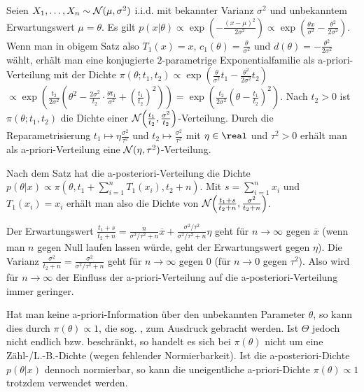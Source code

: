 \linie
\pagebreak

\begin{Bsp}
    Seien $X_1, \dotsc, X_n \sim \mathcal{N}(\mu, \sigma^2)$ i.i.d. mit bekannter Varianz $\sigma^2$
    und unbekanntem Erwartungswert $\mu = \theta$.
    Es gilt $p(x|\theta) \propto \exp\!\left(-\frac{(x - \mu)^2}{2\sigma^2}\right) \propto
    \exp\!\left(\frac{\theta x}{\sigma^2} - \frac{\theta^2}{2\sigma^2}\right)$.
    Wenn man in obigem Satz also $T_1(x) = x$, $c_1(\theta) = \frac{\theta}{\sigma^2}$ und
    $d(\theta) = -\frac{\theta^2}{2\sigma^2}$ wählt,
    erhält man eine konjugierte $2$-parametrige Exponentialfamilie als a-priori-Verteilung mit der
    Dichte $\pi(\theta; t_1, t_2) \propto
    \exp\!\left(\frac{\theta}{\sigma^2} t_1 - \frac{\theta^2}{2\sigma^2} t_2\right)$\\
    $\propto \exp\!\left(\frac{t_2}{2\sigma^2} \left(\theta^2 - \frac{2\sigma^2}{t_2} \cdot
    \frac{\theta t_1}{\sigma^2} + \left(\frac{t_1}{t_2}\right)^2\right)\right)
    = \exp\!\left(\frac{t_2}{2\sigma^2} \left(\theta - \frac{t_1}{t_2}\right)^2\right)$.
    Nach $t_2 > 0$ ist $\pi(\theta; t_1, t_2)$ die Dichte einer
    $\mathcal{N}\!\left(\frac{t_1}{t_2}, \frac{\sigma^2}{t_2}\right)$-Verteilung.
    Durch die Reparametrisierung $t_1 \mapsto \eta \frac{\sigma^2}{\tau^2}$ und
    $t_2 \mapsto \frac{\sigma^2}{\tau^2}$ mit $\eta \in \real$ und $\tau^2 > 0$ erhält man
    als a-priori-Verteilung eine $\mathcal{N}(\eta, \tau^2)$-Verteilung.

    Nach dem Satz hat die a-posteriori-Verteilung die Dichte
    $p(\theta|x) \propto \pi(\theta, t_1 + \sum_{i=1}^n T_1(x_i), t_2 + n)$.
    Mit $s = \sum_{i=1}^n x_i$ und $T_1(x_i) = x_i$ erhält man also die Dichte von
    $\mathcal{N}\!\left(\frac{t_1 + s}{t_2 + n}, \frac{\sigma^2}{t_2 + n}\right)$.

    Der Erwartungswert $\frac{t_1 + s}{t_2 + n} =
    \frac{n}{\sigma^2/\tau^2 + n} \overline{x} +
    \frac{\sigma^2/\tau^2}{\sigma^2/\tau^2+n} \eta$ geht für $n \to \infty$ gegen
    $\overline{x}$ (wenn man $n$ gegen Null laufen lassen würde, geht der Erwartungswert gegen
    $\eta$).
    Die Varianz $\frac{\sigma^2}{t_2 + n} = \frac{\sigma^2}{\sigma^2/\tau^2 + n}$ geht für
    $n \to \infty$ gegen $0$ (für $n \to 0$ gegen $\tau^2$).
    Also wird für $n \to \infty$ der Einfluss der a-priori-Verteilung auf die
    a-posteriori-Verteilung immer geringer.
\end{Bsp}

\begin{Bem}
    Hat man keine a-priori-Information über den unbekannten Parameter $\theta$,
    so kann dies durch $\pi(\theta) \propto 1$, die sog.
    , zum Ausdruck gebracht werden.
    Ist $\Theta$ jedoch nicht endlich bzw. beschränkt, so handelt es sich bei $\pi(\theta)$ nicht
    um eine Zähl-/L.-B.-Dichte (wegen fehlender Normierbarkeit).
    Ist die a-posteriori-Dichte $p(\theta|x)$ dennoch normierbar, so kann die uneigentliche
    a-priori-Dichte $\pi(\theta) \propto 1$ trotzdem verwendet werden.
\end{Bem}

\pagebreak
